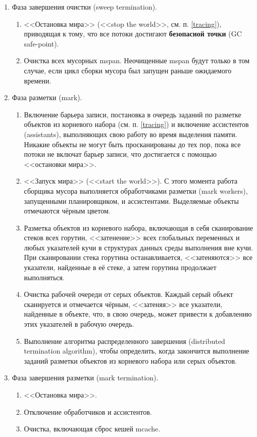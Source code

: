 \begin{enumerate}[label*=\arabic*.]
	\item Фаза завершения очистки (sweep termination).
	\begin{enumerate}[label*=\arabic*.]
		\item <<Остановка мира>> (<<stop the world>>, см. п. \ref{tracing}), приводящая к тому, что все потоки достигают \textbf{безопасной точки} (GC safe-point).
		\item Очистка всех мусорных mspan. Неочищенные mspan будут только в том случае, если цикл сборки мусора был запущен раньше ожидаемого времени.
	\end{enumerate}
	
	\item Фаза разметки (mark).
	\begin{enumerate}[label*=\arabic*.]
		\item Включение барьера записи, постановка в очередь заданий по разметке объектов из корневого набора (см. п. \ref{tracing}) и включение ассистентов (assistants), выполняющих свою работу во время выделения памяти. Никакие объекты не могут быть просканированы до тех пор, пока все потоки не включат барьер записи, что достигается с помощью <<остановки мира>>.
		\item <<Запуск мира>> (<<start the world>>). С этого момента работа сборщика мусора выполняется обработчиками разметки (mark workers), запущенными планировщиком, и ассистентами. Выделяемые объекты отмечаются чёрным цветом.
		\item Разметка объектов из корневого набора, включающая в себя сканирование стеков всех горутин, <<затенение>> всех глобальных переменных и любых указателей кучи в структурах данных среды выполнения вне кучи. При сканировании стека горутина останавливается, <<затеняются>> все указатели, найденные в её стеке, а затем горутина продолжает выполняться.
		\item Очистка рабочей очереди от серых объектов. Каждый серый объект сканируется и отмечается чёрным, <<затеняя>> все указатели, найденные в объекте, что, в свою очередь, может привести к добавлению этих указателей в рабочую очередь.
		\item Выполнение алгоритма распределенного завершения (distributed termination algorithm), чтобы определить, когда закончится выполнение заданий разметки объектов из корневого набора или серых объектов.
	\end{enumerate}
	
	\item Фаза завершения разметки (mark termination).
	\begin{enumerate}[label*=\arabic*.]
		\item <<Остановка мира>>.
		\item Отключение обработчиков и ассистентов.
		\item Очистка, включающая сброс кешей mcache.
	\end{enumerate}
	

\end{enumerate}
